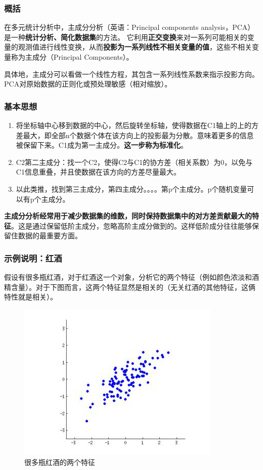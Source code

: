 \documentclass[12pt, letterpaper]{article}
\begin{document}
\subsubsection{概括}
在多元统计分析中，主成分分析（英语：Principal components analysis，PCA）是一种\textbf{统计分析、简化数据集}的方法。
它利用\textbf{正交变换}来对一系列可能相关的变量的观测值进行线性变换，从而\textbf{投影为一系列线性不相关变量的值}，这些不相关变量称为主成分（Principal Components）。

具体地，主成分可以看做一个线性方程，其包含一系列线性系数来指示投影方向。PCA对原始数据的正则化或预处理敏感（相对缩放）。
\subsubsection*{基本思想}
\begin{enumerate}
\item 将坐标轴中心移到数据的中心，然后旋转坐标轴，使得数据在C1轴上的上的方差最大，即全部n个数据个体在该方向上的投影最为分散。意味着更多的信息被保留下来。C1成为第一主成分。\textbf{这一步称为标准化}。
\item 
C2第二主成分：找一个C2，使得C2与C1的协方差（相关系数）为0，以免与C1信息重叠，并且使数据在该方向的方差尽量最大。
\item 以此类推，找到第三主成分，第四主成分。。。。第p个主成分。p个随机变量可以有p个主成分。
\end{enumerate}
\textbf{主成分分析经常用于减少数据集的维数，同时保持数据集中的对方差贡献最大的特征}。这是通过保留低阶主成分，忽略高阶主成分做到的。这样低阶成分往往能够保留住数据的最重要方面。

\subsubsection{示例说明：红酒}
假设有很多瓶红酒，对于红酒这一个对象，分析它的两个特征（例如颜色浓淡和酒精含量）。对于下图而言，这两个特征显然是相关的（无关红酒的其他特征，这俩特性就是相关）。
\begin{figure}[ht]
\centering
\includegraphics[scale=0.5]{两个特征.jpg}
\caption{很多瓶红酒的两个特征}
\end{figure}
\end{document}

